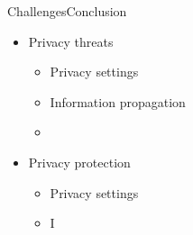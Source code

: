 \begin{frame}[bg]{Challenges}{Conclusion}
	\begin{itemize}
		\item Privacy threats
			\begin{itemize}
				\item Privacy settings
				\item Information propagation
				\item 
			\end{itemize}
		\item Privacy protection
			\begin{itemize}
				\item Privacy settings
				\item I
			\end{itemize}
	\end{itemize}
	
\end{frame}


